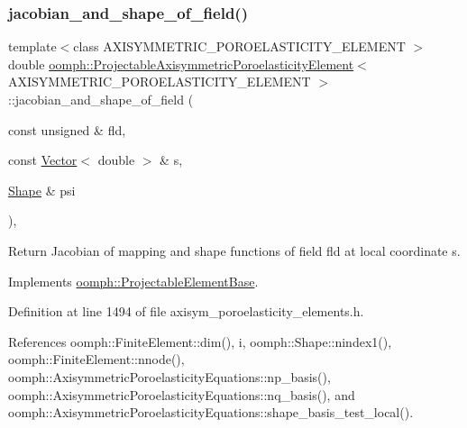 \subsubsection{\texorpdfstring{jacobian\+\_\+and\+\_\+shape\+\_\+of\+\_\+field()}{jacobian\_and\_shape\_of\_field()}}
{\footnotesize\ttfamily template$<$class A\+X\+I\+S\+Y\+M\+M\+E\+T\+R\+I\+C\+\_\+\+P\+O\+R\+O\+E\+L\+A\+S\+T\+I\+C\+I\+T\+Y\+\_\+\+E\+L\+E\+M\+E\+NT $>$ \\
double \hyperlink{classoomph_1_1ProjectableAxisymmetricPoroelasticityElement}{oomph\+::\+Projectable\+Axisymmetric\+Poroelasticity\+Element}$<$ A\+X\+I\+S\+Y\+M\+M\+E\+T\+R\+I\+C\+\_\+\+P\+O\+R\+O\+E\+L\+A\+S\+T\+I\+C\+I\+T\+Y\+\_\+\+E\+L\+E\+M\+E\+NT $>$\+::jacobian\+\_\+and\+\_\+shape\+\_\+of\+\_\+field (\begin{DoxyParamCaption}\item[{const unsigned \&}]{fld,  }\item[{const \hyperlink{classoomph_1_1Vector}{Vector}$<$ double $>$ \&}]{s,  }\item[{\hyperlink{classoomph_1_1Shape}{Shape} \&}]{psi }\end{DoxyParamCaption})\hspace{0.3cm}{\ttfamily [inline]}, {\ttfamily [virtual]}}



Return Jacobian of mapping and shape functions of field fld at local coordinate s. 



Implements \hyperlink{classoomph_1_1ProjectableElementBase_ad45c21b58c0985d52f68ab2d79cbb488}{oomph\+::\+Projectable\+Element\+Base}.



Definition at line 1494 of file axisym\+\_\+poroelasticity\+\_\+elements.\+h.



References oomph\+::\+Finite\+Element\+::dim(), i, oomph\+::\+Shape\+::nindex1(), oomph\+::\+Finite\+Element\+::nnode(), oomph\+::\+Axisymmetric\+Poroelasticity\+Equations\+::np\+\_\+basis(), oomph\+::\+Axisymmetric\+Poroelasticity\+Equations\+::nq\+\_\+basis(), and oomph\+::\+Axisymmetric\+Poroelasticity\+Equations\+::shape\+\_\+basis\+\_\+test\+\_\+local().

\mbox{\label{classoomph_1_1ProjectableAxisymmetricPoroelasticityElement_a083614b12898ca9057debe48aa81364a}} 
